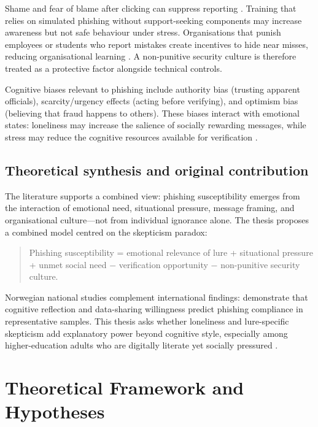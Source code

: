 \documentclass[UKenglish,12pt]{master-style}
\begin{document}
Shame and fear of blame after clicking can suppress reporting \parencite{chen2024roleplaying}. Training that relies on simulated phishing without support-seeking components may increase awareness but not safe behaviour under stress. Organisations that punish employees or students who report mistakes create incentives to hide near misses, reducing organisational learning \parencite{baylsmith2024phishing}. A non-punitive security culture is therefore treated as a protective factor alongside technical controls.

Cognitive biases relevant to phishing include authority bias (trusting apparent officials), scarcity/urgency effects (acting before verifying), and optimism bias (believing that fraud happens to others). These biases interact with emotional states: loneliness may increase the salience of socially rewarding messages, while stress may reduce the cognitive resources available for verification \parencite{cacioppo2008loneliness,tsai2021phishing}.

\section{Theoretical synthesis and original contribution}

The literature supports a combined view: phishing susceptibility emerges from the interaction of emotional need, situational pressure, message framing, and organisational culture---not from individual ignorance alone. The thesis proposes a combined model centred on the skepticism paradox:

\begin{quote}
Phishing susceptibility = emotional relevance of lure + situational pressure + unmet social need $-$ verification opportunity $-$ non-punitive security culture.
\end{quote}

Norwegian national studies complement international findings: \textcite{tjostheim2020phishing,tjostheim2022crt} demonstrate that cognitive reflection and data-sharing willingness predict phishing compliance in representative samples. This thesis asks whether loneliness and lure-specific skepticism add explanatory power beyond cognitive style, especially among higher-education adults who are digitally literate yet socially pressured \parencite{kluetsch2024friend,shot2022}.

\chapter{Theoretical Framework and Hypotheses}
\end{document}

